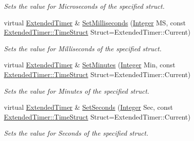 \begin{DoxyCompactItemize}
\begin{DoxyCompactList}\small\item\em Sets the value for Microseconds of the specified struct. \item\end{DoxyCompactList}\item 
virtual \hyperlink{classMezzanine_1_1ExtendedTimer}{ExtendedTimer} \& \hyperlink{classMezzanine_1_1ExtendedTimer_aa0aa81de0f595c5c59525fb8bfe57696}{SetMilliseconds} (\hyperlink{namespaceMezzanine_ac3576e52af3c62d13dde94829e0c5465}{Integer} MS, const \hyperlink{classMezzanine_1_1ExtendedTimer_a52119e2da54ea7ae5da0dc1f921a3b61}{ExtendedTimer::TimeStruct} Struct=ExtendedTimer::Current)
\begin{DoxyCompactList}\small\item\em Sets the value for Milliseconds of the specified struct. \item\end{DoxyCompactList}\item 
virtual \hyperlink{classMezzanine_1_1ExtendedTimer}{ExtendedTimer} \& \hyperlink{classMezzanine_1_1ExtendedTimer_a7779f8dcba1a632ef3dd1bc5b89570c6}{SetMinutes} (\hyperlink{namespaceMezzanine_ac3576e52af3c62d13dde94829e0c5465}{Integer} Min, const \hyperlink{classMezzanine_1_1ExtendedTimer_a52119e2da54ea7ae5da0dc1f921a3b61}{ExtendedTimer::TimeStruct} Struct=ExtendedTimer::Current)
\begin{DoxyCompactList}\small\item\em Sets the value for Minutes of the specified struct. \item\end{DoxyCompactList}\item 
virtual \hyperlink{classMezzanine_1_1ExtendedTimer}{ExtendedTimer} \& \hyperlink{classMezzanine_1_1ExtendedTimer_af367348e4289284749a5174672dd18a8}{SetSeconds} (\hyperlink{namespaceMezzanine_ac3576e52af3c62d13dde94829e0c5465}{Integer} Sec, const \hyperlink{classMezzanine_1_1ExtendedTimer_a52119e2da54ea7ae5da0dc1f921a3b61}{ExtendedTimer::TimeStruct} Struct=ExtendedTimer::Current)
\begin{DoxyCompactList}\small\item\em Sets the value for Seconds of the specified struct. \item\end{DoxyCompactList}\end{DoxyCompactItemize}
